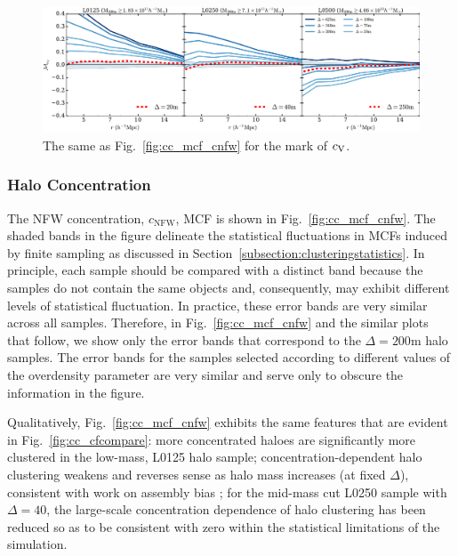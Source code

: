 \documentclass[usenatbib,fleqn]{mnras}
\begin{document}
\begin{figure}
	\centering
	\includegraphics[width=\textwidth]{all_mcf_cV.pdf}
	\caption{	
The same as Fig.~\ref{fig:cc_mcf_cnfw} for the mark of $c_{\rm V}$.
}
	\label{fig:cc_mcf_cV}
\end{figure}

\subsubsection{Halo Concentration}

The NFW concentration, $c_{\mathrm{NFW}}$, MCF is shown in Fig.~\ref{fig:cc_mcf_cnfw}. The shaded bands in the figure delineate the statistical fluctuations in MCFs induced by finite sampling as discussed in Section~\ref{subsection:clusteringstatistics}. In principle, each sample should be compared with a distinct band because the samples do not contain the same objects and, consequently, may exhibit different levels of statistical fluctuation. In practice, these error bands are very similar across all samples. Therefore, in Fig.~\ref{fig:cc_mcf_cnfw} and the similar plots that follow, we show only the error bands that correspond to the $\Delta=200$m halo samples. The error bands for the samples selected according to different values of the overdensity parameter are very similar and serve only to obscure the information in the figure. 

Qualitatively, Fig.~\ref{fig:cc_mcf_cnfw} exhibits the same features that are evident in Fig.~\ref{fig:cc_cfcompare}: more concentrated haloes are significantly more clustered in the low-mass, L0125 halo sample; concentration-dependent halo clustering weakens and reverses sense as halo mass increases (at fixed $\Delta$), consistent with work on assembly bias \citep{wechsler_etal06,sunayama_etal16}; for the mid-mass cut L0250 sample with $\Delta=40$, the large-scale concentration dependence of halo clustering has been reduced so as to be consistent with zero within the statistical limitations of the simulation. 
\end{document}
